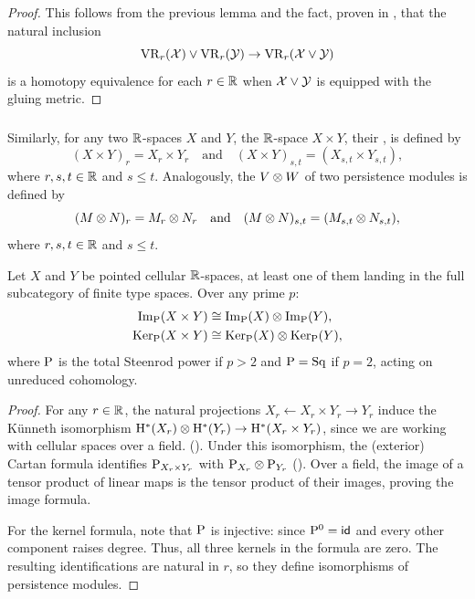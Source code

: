 \begin{proof}
	This follows from the previous lemma and the fact, proven in \cite[Proposition~1]{adamaszek2020homotopy}, that the natural inclusion
	\[
	\mathrm{VR}_r(\mathcal{X}) \vee \mathrm{VR}_r(\mathcal{Y}) \to \mathrm{VR}_r(\mathcal{X} \vee \mathcal{Y})
	\]
	is a homotopy equivalence for each $r \in \mathbb{R}$ when \(\mathcal{X} \vee \mathcal{Y}\) is equipped with the gluing metric.
\end{proof}

\subsubsection{}\label{ss:product_general}

Similarly, for any two $\mathbb{R}$-spaces $X$ and $Y$, the $\mathbb{R}$-space $X \times Y$, their , is defined by
\[
(X \times Y)_r = X_r \times Y_r \quad\text{and}\quad (X \times Y)_{s,t} = (X_{s,t} \times Y_{s,t}),
\]
where \(r, s, t \in \mathbb{R}\) and \(s \leq t\).
Analogously, the  \(V \otimes W\) of two persistence modules is defined by
\[
(M \otimes N)_r = M_r \otimes N_r \quad\text{and}\quad (M \otimes N)_{s,t} = (M_{s,t} \otimes N_{s,t}),
\]
where \(r, s, t \in \mathbb{R}\) and \(s \leq t\).

\lemma
Let $X$ and $Y$ be pointed cellular $\mathbb{R}$-spaces, at least one of them landing in the full subcategory of finite type spaces.
Over any prime \(p\):
\begin{align*}
	\operatorname{Im}_{\mathrm{P}}(X \times Y) &\cong \operatorname{Im}_{\mathrm{P}}(X) \otimes \operatorname{Im}_{\mathrm{P}}(Y),\\
	\operatorname{Ker}_{\mathrm{P}}(X \times Y) &\cong \operatorname{Ker}_{\mathrm{P}}(X) \otimes \operatorname{Ker}_{\mathrm{P}}(Y),
\end{align*}
where \(\mathrm{P}\) is the total Steenrod power if \(p > 2\) and \(\mathrm{P} = \mathrm{Sq}\) if \(p = 2\), acting on unreduced cohomology.

\begin{proof}
	For any \(r \in \mathbb{R}\), the natural projections $X_r \leftarrow X_r \times Y_r \to Y_r$ induce the K\"unneth isomorphism $\mathrm{H}^*(X_r) \otimes \mathrm{H}^*(Y_r) \to \mathrm{H}^*(X_r \times Y_r)$, since we are working with cellular spaces over a field. (\cite[Theorem~3.15]{hatcher2000}).
	Under this isomorphism, the (exterior) Cartan formula identifies \(\mathrm{P}_{X_r \times Y_r}\) with \(\mathrm{P}_{X_r} \otimes \mathrm{P}_{Y_r}\) (\cite[Corollary~2.7]{may1970general}).
	Over a field, the image of a tensor product of linear maps is the tensor product of their images, proving the image formula.

	For the kernel formula, note that \(\mathrm{P}\) is injective: since \(\mathrm{P}^0 = \mathsf{id}\) and every other component raises degree.
	Thus, all three kernels in the formula are zero.
	The resulting identifications are natural in \(r\), so they define isomorphisms of persistence modules.
\end{proof}

